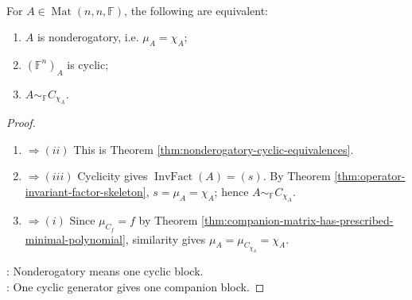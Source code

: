 \begin{corollary} \label{cor:nonderogatory-iff-companion-similar} \\
For $A\in\operatorname{Mat}(n,n,\mathbb{F})$, the following are equivalent:
\begin{enumerate}[label=(\roman*)]
\setlength{\itemsep}{0pt}
\item $A$ is nonderogatory, i.e. $\mu_A=\chi_A$;
\item $(\mathbb{F}^n)_A$ is cyclic;
\item $A\sim_{\mathbb{F}}C_{\chi_A}$.
\end{enumerate}
\begin{proof}
\begin{enumerate}[label=(\roman*).]
\setlength{\itemsep}{0pt}
\item[$(i)$]$\Rightarrow (ii)$ This is Theorem \ref{thm:nonderogatory-cyclic-equivalences}.
\item[$(ii)$]$\Rightarrow (iii)$ Cyclicity gives $\operatorname{InvFact}(A)=(s)$. By Theorem \ref{thm:operator-invariant-factor-skeleton}, $s=\mu_A=\chi_A$; hence $A\sim_{\mathbb{F}}C_{\chi_A}$.
\item[$(iii)$]$\Rightarrow (i)$ Since $\mu_{C_f}=f$ by Theorem \ref{thm:companion-matrix-has-prescribed-minimal-polynomial}, similarity gives $\mu_A=\mu_{C_{\chi_A}}=\chi_A$.
\end{enumerate}
: Nonderogatory means one cyclic block.\\
: One cyclic generator gives one companion block.
\end{proof}
\end{corollary}

